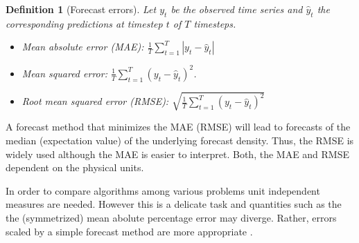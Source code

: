\documentclass[12pt,a4paper]{article}
\newtheorem{definition}{Definition}
\begin{document}
\begin{definition}[Forecast errors]
Let $y_t$ be the observed time series and  $\hat y_t$ the corresponding predictions at timestep $t$  of $T$ timesteps.
	\begin{itemize}
		\item Mean absolute error (MAE):  $\frac{1}{T}\sum_{t=1}^T \left | y_t - \hat y_t\right |$
		  \item Mean squared error: $\frac{1}{T}\sum_{t=1}^T \left ( y_t - \hat y_t\right ) ^2$. 
		  \item Root mean squared error (RMSE):  $\sqrt{\frac{1}{T}\sum_{t=1}^T \left ( y_t - \hat y_t\right ) ^2}$
	\end{itemize}
\end{definition}
A forecast method that minimizes the MAE (RMSE) will lead to forecasts of the median (expectation value) of the underlying forecast density. Thus, the RMSE is widely used although the MAE is easier to interpret. Both, the MAE and RMSE dependent on the physical units. 

In order to compare algorithms among various problems unit independent measures are needed. However this is a delicate task and quantities such as the the  (symmetrized) mean abolute percentage error may diverge. Rather, errors scaled by a simple forecast method are more appropriate \cite{hyndman_forecasting_principles_2018, Hyndman06anotherlook}. 
\end{document}
